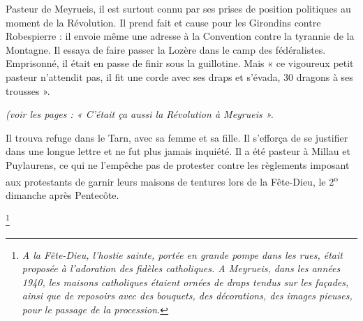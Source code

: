 Pasteur de Meyrueis, il est surtout connu par ses prises de position politiques au
moment de la Révolution. Il prend fait et cause pour les Girondins contre
Robespierre : il envoie même une adresse à la Convention contre la tyrannie de la
Montagne. Il essaya de faire passer la Lozère dans le camp des fédéralistes.
Emprisonné, il était en passe de finir sous la guillotine. Mais « ce vigoureux petit
pasteur n’attendit pas, il fit une corde avec ses draps et s’évada, 30 dragons à ses
trousses ».

\emph{(voir les pages : « C’était ça aussi la Révolution à Meyrueis ».}

Il trouva refuge dans le Tarn, avec sa femme et sa fille. Il s’efforça de se justifier
dans une longue lettre et ne fut plus jamais inquiété. Il a été pasteur à Millau et
Puylaurens, ce qui ne l’empêche pas de protester contre les règlements imposant
aux protestants de garnir leurs maisons de tentures lors de la Fête-Dieu, le 2\textsuperscript{o}
dimanche après Pentecôte.

\footnote{\emph{A la Fête-Dieu, l’hostie sainte, portée en grande pompe dans les rues, était proposée à l’adoration des fidèles catholiques. A Meyrueis, dans les années 1940, les maisons catholiques étaient ornées de draps tendus sur les façades, ainsi que de reposoirs avec des bouquets, des décorations, des images pieuses, pour le passage de la procession.}}
